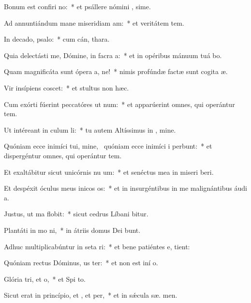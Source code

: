 \item Bonum est confiri no:~* et psállere nómini , sime.
\item Ad annuntiándum mane miseridiam am:~* et veritátem   tem.
\item In decado, psalo:~* cum cán,  thara.
\item Quia delectásti me, Dómine, in facra a:~* et in opéribus mánuum tuá bo.
\item Quam magnificáta sunt ópera a, ne!~* nimis profúndæ factæ sunt cogita æ.
\item Vir insípiens  coscet:~* et stultus non  hæc.
\item Cum exórti fúerint peccatóres ut num:~* et apparúerint omnes, qui operántur tem.
\item Ut intéreant in culum li:~* tu autem Altíssimus in , mine.
\item Quóniam ecce inimíci tui, mine,~\pscross{} quóniam ecce inimíci i perbunt:~* et dispergéntur omnes, qui operántur tem.
\item Et exaltábitur sicut unicórnis nu um:~* et senéctus mea in miseri beri.
\item Et despéxit óculus meus inicos os:~* et in insurgéntibus in me malignántibus áudi  a.
\item Justus, ut ma flobit:~* sicut cedrus Líbani bitur.
\item Plantáti in mo ni,~* in átriis domus Dei  bunt.
\item Adhuc multiplicabúntur in seta ri:~* et bene patiéntes e,  tient:
\item Quóniam rectus Dóminus, us ter:~* et non est iní  o.
\item Glória tri, et o,~* et Spi to.
\item Sicut erat in princípio, et , et per,~* et in sǽcula sæ. men.
